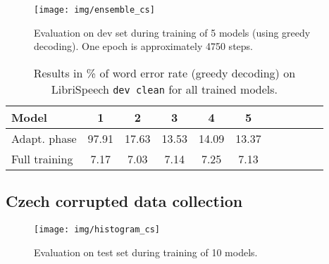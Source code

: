 \begin{figure*}[h]
		\texttt{[image: img/ensemble\_cs]}
		\caption{Evaluation on dev set during training of 5 models (using greedy decoding). One epoch is approximately 4750 steps.}
		\label{fig:ensemble_training_cs}
\end{figure*}

\begin{table}[h]
		\centering
		\begin{tabular}{l|cccccccccc}
			\bf Model & \bf 1 & \bf 2 & \bf 3 & 4 & \bf 5  \\
			\hline 
			
			Adapt. phase &
            97.91 &
            17.63 &
            13.53 &
            14.09 &
            13.37 \\
            Full training &
            7.17 &
            7.03 &
            7.14 &
            7.25 &
            7.13 
			
		\end{tabular}
		\caption{Results in \% of word error rate (greedy decoding) on LibriSpeech \texttt{dev clean} for all trained models.}
		\label{tab:cs_folds}
\end{table}

\subsection{Czech corrupted data collection}

\begin{figure*}[t]
	\texttt{[image: img/histogram\_cs]}
	\caption{Evaluation on test set during training of 10 models.}
	\label{fig:histogram_cs}
\end{figure*}


